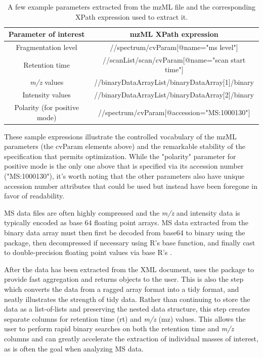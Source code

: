 \begin{table}[h]
\begin{center}
\begin{tabular}{|c|c|}
    \toprule
    Parameter of interest & mzML XPath expression \\
    \midrule
    Fragmentation level & //spectrum/cvParam[@name="ms level"] \\
    Retention time & //scanList/scan/cvParam[@name="scan start time"] \\
    \emph{m/z} values & //binaryDataArrayList/binaryDataArray[1]/binary \\
    Intensity values & //binaryDataArrayList/binaryDataArray[2]/binary \\
    Polarity (for positive mode) & //spectrum/cvParam[@accession="MS:1000130"] \\
    \bottomrule
\end{tabular}
\end{center}
    \caption{A few example parameters extracted from the mzML file and the corresponding XPath expression used to extract it.}
    \label{tab:XPathparams}
\end{table}

These sample expressions illustrate the controlled vocabulary of the mzML parameters (the cvParam elements above) and the remarkable stability of the specification that permits optimization. While the "polarity" parameter for positive mode is the only one above that is specified via its accession number ("MS:1000130"), it's worth noting that the other parameters also have unique accession number attributes that could be used but instead have been foregone in favor of readability.

MS data files are often highly compressed and the \emph{m/z} and intensity data is typically encoded as base 64 floating point arrays. MS data extracted from the binary data array must then first be decoded from base64 to binary using the  package, then decompressed if necessary using R's base  function, and finally cast to double-precision floating point values via base R's .

After the data has been extracted from the XML document,  uses the  package to provide fast aggregation and returns  objects to the user. This is also the step which converts the data from a ragged array format into a tidy format, and neatly illustrates the strength of tidy data. Rather than continuing to store the data as a list-of-lists and preserving the nested data structure, this step creates separate columns for retention time (rt) and \emph{m/z} (mz) values. This allows the user to perform rapid binary searches on both the retention time and \emph{m/z} columns and can greatly accelerate the extraction of individual masses of interest, as is often the goal when analyzing MS data.

